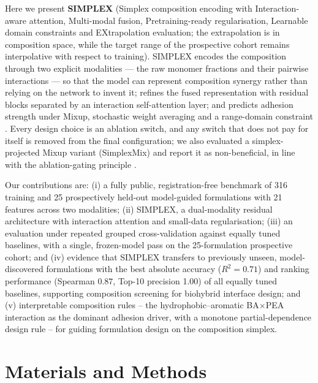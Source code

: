 \documentclass[utf8]{FrontiersinHarvard}
\begin{document}
Here we present \textbf{SIMPLEX} (Simplex composition encoding with Interaction-aware attention, Multi-modal fusion, Pretraining-ready regularisation, Learnable domain constraints and EXtrapolation evaluation; the extrapolation is in composition space, while the target range of the prospective cohort remains interpolative with respect to training). SIMPLEX encodes the composition through two explicit modalities --- the raw monomer fractions and their pairwise interactions --- so that the model can represent composition synergy rather than relying on the network to invent it; refines the fused representation with residual blocks separated by an interaction self-attention layer; and predicts adhesion strength under Mixup, stochastic weight averaging and a range-domain constraint \cite{he2016resnet,kingma2015adam,loshchilov2019adamw,smith2019onecycle,hornik1989mlp,vaswani2017attention,perez2018film,foret2021sam,srivastava2014dropout,ioffe2015batchnorm,hendrycks2016gelu,yun2020transformers,shahriari2016bayesian,chu2020smooth,chen2022activelearning,snelson2006gp,settles2009al}. Every design choice is an ablation switch, and any switch that does not pay for itself is removed from the final configuration; we also evaluated a simplex-projected Mixup variant (SimplexMix) and report it as non-beneficial, in line with the ablation-gating principle \cite{egozcue2003clr,cole2020design,wang2023hydrogelML,pawlowsky2015modeling}.

Our contributions are: (i) a fully public, registration-free benchmark of 316 training and 25 prospectively held-out model-guided formulations with 21 features across two modalities; (ii) SIMPLEX, a dual-modality residual architecture with interaction attention and small-data regularisation; (iii) an evaluation under repeated grouped cross-validation against equally tuned baselines, with a single, frozen-model pass on the 25-formulation prospective cohort; and (iv) evidence that SIMPLEX transfers to previously unseen, model-discovered formulations with the best absolute accuracy ($R^2 = 0.71$) and ranking performance (Spearman $0.87$, Top-10 precision 1.00) of all equally tuned baselines, supporting composition screening for biohybrid interface design; and (v) interpretable composition rules -- the hydrophobic--aromatic BA$\times$PEA interaction as the dominant adhesion driver, with a monotone partial-dependence design rule -- for guiding formulation design on the composition simplex.

\section{Materials and Methods}
\end{document}
